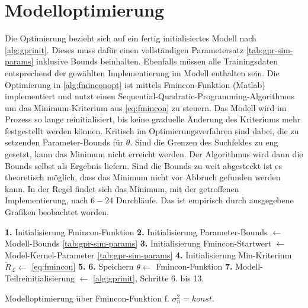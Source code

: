 \clearpage


\section{Modelloptimierung}\label{sec:gpropt}


Die Optimierung bezieht sich auf ein fertig initialisiertes Modell nach \autoref{alg:gprinit}. Dieses muss dafür einen vollständigen Parametersatz \autoref{tab:gpr-sim-params} inklusive Bounds beinhalten. Ebenfalls müssen alle Trainingsdaten entsprechend der gewählten Implementierung im Modell enthalten sein. Die Optimierung in \autoref{alg:fminconopt} ist mittels Fmincon-Funktion (Matlab) implementiert und nutzt einen Sequential-Quadratic-Programming-Algorithmus um das Minimum-Kriterium aus \autoref{eq:fmincon} zu steuern. Das Modell wird im Prozess so lange reinitialisiert, bis keine graduelle Änderung des Kriteriums mehr festgestellt werden können. Kritisch im Optimierungsverfahren sind dabei, die zu setzenden Parameter-Bounds für $\theta$. Sind die Grenzen des Suchfeldes zu eng gesetzt, kann das Minimum nicht erreicht werden. Der Algorithmus wird dann die Bounds selbst als Ergebnis liefern. Sind die Bounds zu weit abgesteckt ist es theoretisch möglich, dass das Minimum nicht vor Abbruch gefunden werden kann. In der Regel findet sich das Minimum, mit der getroffenen Implementierung, nach $6-24$ Durchläufe. Das ist empirisch durch ausgegebene Grafiken beobachtet worden.


\begin{algorithm}[htp]
	\SetAlgoLined
	\textbf{1.} Initialisierung Fmincon-Funktion\;
	\textbf{2.} Initialisierung Parameter-Bounds $\leftarrow$ Modell-Bounds \autoref{tab:gpr-sim-params}\;
	\textbf{3.} Initialisierung Fmincon-Startwert $\leftarrow$ Model-Kernel-Parameter \autoref{tab:gpr-sim-params}\;
	\textbf{4.} Initialisierung Min-Kriterium $\tilde{R}_{\mathcal{L}} \leftarrow$ \autoref{eq:fmincon}\;
	\textbf{5.} 
	\textbf{6.} Speichern $\theta \leftarrow$ Fmincon-Funktion\;
	\textbf{7.} Modell-Teilreinitialisierung $\leftarrow$ \autoref{alg:gprinit}, Schritte 6. bis 13.\;
	\caption{Modelloptimierung über Fmincon-Funktion f. $\sigma_n^2 = konst.$}
	\label{alg:fminconopt}
\end{algorithm}



